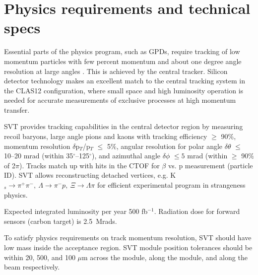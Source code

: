 \section{Physics requirements and technical specs}

Essential parts of the physics program, such as GPDs, require tracking of low momentum  particles with few percent momentum and about one degree angle resolution at large angles \cite{TDR12}. This is achieved by the central tracker.  
Silicon detector technology makes an excellent match to the central tracking system in the CLAS12 configuration, where small space and high luminosity operation is needed for accurate measurements of exclusive processes at high momentum transfer.

SVT provides tracking capabilities in the central detector region by measuring recoil baryons, large angle pions and kaons with tracking efficiency $\ge$ 90$\%$, momentum resolution $\delta$p$_{T}$/p$_{T}$ $\le$ 5$\%$, angular resolution for polar angle $\delta$$\theta$ $\le$ 10--20 mrad (within 35$^\circ$--125$^\circ$), and azimuthal angle $\delta$$\phi$ $\le5$ mrad (within $\ge$ 90$\%$ of 2$\pi$). Tracks match up with hits in the CTOF for $\beta$ vs. p measurement (particle ID). SVT allows reconstructing detached vertices, e.g. K$_{s}\!\to\!\pi^{+}\pi^{-},~\Lambda\!\to\!\pi^{-}p,~\Xi\!\to\!\Lambda\pi$ for efficient experimental program in strangeness physics.  

Expected integrated luminosity per year 500 fb$^{-1}$. Radiation dose for forward sensors (carbon target) is 2.5~Mrads.

To satisfy physics requirements on track momentum resolution, SVT should have low mass inside the acceptance region. SVT module position tolerances should be within 20, 500, and 100 $\mu$m across the module, along the module, and along the beam respectively.

